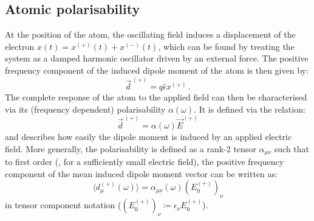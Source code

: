 \documentclass[../Thesis-IJspeert.tex]{subfiles}
\begin{document}
\subsection{Atomic polarisability}
At the position of the atom, the oscillating field induces a displacement of the electron $x(t)=x^{(+)}(t)+x^{(-)}(t)$, which can be found by treating the system as a damped harmonic oscillator driven by an external force. The positive frequency component of the induced dipole moment of the atom is then given by:
\begin{equation}
\label{dipolemoment}
\vec{d}^{\,(+)}= q \hat{\epsilon} x^{(+)} \,.
\end{equation}
The complete response of the atom to the applied field can then be characterised via its (frequency dependent) polarisability $\alpha (\omega)$. It is defined via the relation:
\begin{equation}
	\vec{d}^{\,(+)}=\alpha(\omega)\vec{E}^{(+)}
\end{equation}
and describes how easily the dipole moment is induced by an applied electric field. More generally, the polarisability is defined as a rank-2 tensor $\alpha_{\mu \nu}$ such that to first order (\ie, for a sufficiently small electric field), the positive frequency component of the mean induced dipole moment vector can be written as:
\begin{equation}
\label{definingrelationpolarisability}
\langle d_\mu^{(+)}(\omega) \rangle = \alpha_{\mu \nu}(\omega) ( E_0^{(+)} )_\nu
\end{equation}
in tensor component notation ($( E_0^{(+)} )_\nu\coloneqq{\epsilon}_\nu E_0^{(+)}$).
\end{document}
